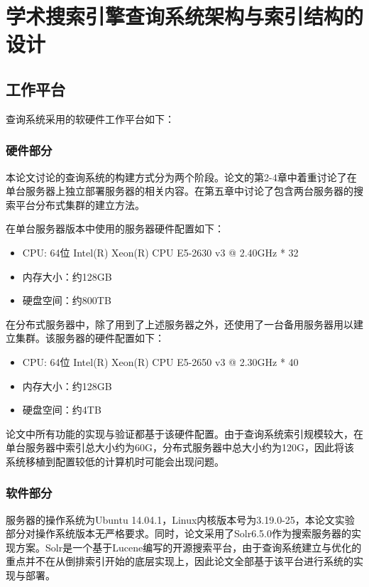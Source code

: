 
\chapter{学术搜索引擎查询系统架构与索引结构的设计}
\label{chap:c2}
\section{工作平台}
    查询系统采用的软硬件工作平台如下：
    \subsection{硬件部分}
        本论文讨论的查询系统的构建方式分为两个阶段。论文的第2-4章中着重讨论了在单台服务器上独立部署服务器的相关内容。在第五章中讨论了包含两台服务器的搜索平台分布式集群的建立方法。
        
        在单台服务器版本中使用的服务器硬件配置如下：
        \begin{itemize}
        \item CPU: 64位 Intel(R) Xeon(R) CPU E5-2630 v3 @ 2.40GHz * 32
        \item 内存大小：约128GB
        \item 硬盘空间：约800TB
        \end{itemize}
        在分布式服务器中，除了用到了上述服务器之外，还使用了一台备用服务器用以建立集群。该服务器的硬件配置如下：
        \begin{itemize}
        \item CPU: 64位 Intel(R) Xeon(R) CPU E5-2650 v3 @ 2.30GHz * 40
        \item 内存大小：约128GB
        \item 硬盘空间：约4TB
        \end{itemize}
        论文中所有功能的实现与验证都基于该硬件配置。由于查询系统索引规模较大，在单台服务器中索引总大小约为60G，分布式服务器中总大小约为120G，因此将该系统移植到配置较低的计算机时可能会出现问题。
    \subsection{软件部分}
        服务器的操作系统为Ubuntu 14.04.1，Linux内核版本号为3.19.0-25，本论文实验部分对操作系统版本无严格要求。同时，论文采用了Solr6.5.0作为搜索服务器的实现方案。Solr是一个基于Lucene编写的开源搜索平台，由于查询系统建立与优化的重点并不在从倒排索引开始的底层实现上，因此论文全部基于该平台进行系统的实现与部署。

